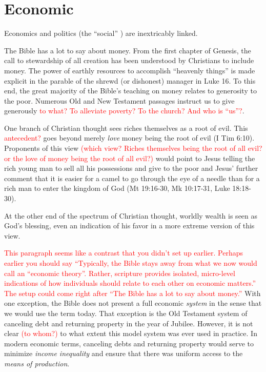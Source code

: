 \documentclass[12pt]{article}
\newcommand{\ins}[1]{\textcolor{red}{#1}}
\begin{document}
\section{Economic}
\label{sec:economic}
Economics and politics (the ``social'' ) are inextricably linked.

The Bible has a lot to say about money. From the first chapter of Genesis, the call to
stewardship of all creation has been understood by Christians to include money. The power
of earthly resources to accomplish ``heavenly things'' is made explicit in the parable of
the shrewd (or dishonest) manager in Luke 16. To this end, the great majority of the
Bible's teaching on money relates to generosity to the poor. Numerous Old and New
Testament passages instruct us to give generously 
\ins{to what? To alleviate poverty? To the church?  And who is ``us''?}.

One branch of Christian thought sees riches themselves as a root of evil. 
This \ins{antecedent?} goes beyond
merely \emph{love} money being the root of evil (I Tim 6:10). Proponents of this view
\ins{(which view? Riches themselves being the root of all evil?
or the love of money being the root of all evil?)}
would point to Jesus telling the rich young man to sell all his possessions and give to
the poor and Jesus' further comment that it is easier for a camel to go through the eye of
a needle than for a rich man to enter the kingdom of God (Mt 19:16-30, Mk 10:17-31, Luke
18:18-30).

At the other end of the spectrum of Christian thought, worldly wealth is seen as God's
blessing, even an indication of his favor in a more extreme version of this view.

\ins{This paragraph seems like a contrast that you didn't set up earlier. 
Perhaps earlier you should say ``Typically, the Bible stays away from 
what we now would call an ``economic theory''. 
Rather, scripture provides isolated, micro-level indications of how individuals
should relate to each other on economic matters.''
The setup could come right after ``The Bible has a lot to say about money.''}
With one exception, the Bible does not present a full economic \emph{system} 
in the sense that we would use the term today.
That exception is the Old Testament system of canceling debt and returning property in the
year of Jubilee. However, it is not clear \ins{(to whom?)} 
to what extent this model system was ever used in practice.
In modern economic terms, canceling debts and returning property would serve to minimize 
\emph{income inequality} and ensure that there was uniform access to the \emph{means of production}.
\end{document}
